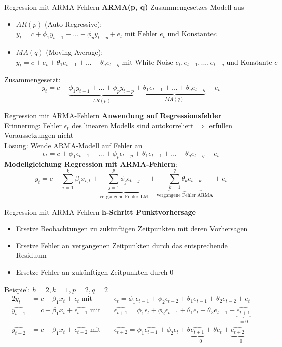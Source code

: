 \begin{frame}{Regression mit ARMA-Fehlern}
	\textbf{ARMA(p, q)}
	Zusammengesetzes Modell aus
	\begin{itemize}
		\item $AR(p)$ (Auto Regressive): $y_{t} = c + \phi_1 y_{t-1} + ... + \phi_p y_{t-p} + e_t \text{ mit Fehler }e_t\text{ und Konstante}c$
		\item $MA(q)$ (Moving Average): $y_{t} = c + e_t + \theta_1 e_{t-1} + ... + \theta_q e_{t-q}\text{ mit White Noise }e_t,e_{t-1},...,e_{t-q}\text{ und Konstante }c$
	\end{itemize}
	Zusammengesetzt:
	$$y_{t} = c + \underbrace{\phi_1 y_{t-1} + ... + \phi_p y_{t-p}}_{AR(p)} + \underbrace{\theta_1 e_{t-1} + ... + \theta_q e_{t-q}}_{MA(q)} + e_t$$
\end{frame}

\begin{frame}{Regression mit ARMA-Fehlern}
	\textbf{Anwendung auf Regressionsfehler} \\
	\underline{Erinnerung}: Fehler $\epsilon_t$ des linearen Modells sind autokorreliert $\Rightarrow$ erfüllen Voraussetzungen nicht\\
	\underline{Lösung}: Wende ARMA-Modell auf Fehler an
	$$\epsilon_{t} = c + \phi_1 \epsilon_{t-1} + ... + \phi_p \epsilon_{t-p} + \theta_1 e_{t-1} + ... + \theta_q e_{t-q} + e_t$$
	\textbf{Modellgleichung Regression mit ARMA-Fehlern}:
	$$y_t = c + \sum_{i=1}^{k}{\beta_i x_{i,t}} + \underbrace{\sum_{j=1}^{p}{\phi_j\epsilon_{t-j}}}_{\text{vergangene Fehler LM}} + \underbrace{\sum_{k=1}^{q}{\theta_k e_{t-k}}}_{\text{vergangene Fehler ARMA}} + e_t$$
	
\end{frame}

\begin{frame}{Regression mit ARMA-Fehlern}
	\textbf{h-Schritt Punktvorhersage}\\
	\begin{itemize}
		\item Ersetze Beobachtungen zu zukünftigen Zeitpunkten mit deren Vorhersagen
		\item Ersetze Fehler an vergangenen Zeitpunkten durch das entsprechende Residuum
		\item Ersetze Fehler an zukünftigen Zeitpunkten durch 0
	\end{itemize}
	\underline{Beispiel}: $h=2, k=1, p=2, q=2$
	\begin{alignat*}{2}
		y_t &= c + \beta_1 x_{t} + \epsilon_t \text{ mit }&&\epsilon_{t} = \phi_1\epsilon_{t-1} + \phi_2\epsilon_{t-2} + \theta_1e_{t-1} + \theta_2e_{t-2} + e_t \\		
		\widehat{y_{t+1}} &= c + \beta_1 x_{t} + \widehat{\epsilon_{t+1}} \text{ mit }&& \widehat{\epsilon_{t+1}} = \phi_1\epsilon_{t} + \phi_2\epsilon_{t-1} + \theta_1e_{t} + \theta_2e_{t-1} + \underbrace{\widehat{e_{t+1}}}_{=0}\\
		\widehat{y_{t+2}} &= c + \beta_1 x_{t} + \widehat{\epsilon_{t+2}}\text{ mit }&&\widehat{\epsilon_{t+2}} = \phi_1\widehat{\epsilon_{t+1}} + \phi_2\epsilon_t + \theta \underbrace{\widehat{e_{t+1}}}_{=0} + \theta e_t + \underbrace{\widehat{e_{t+2}}}_{=0}
	\end{alignat*}
\end{frame}

	


